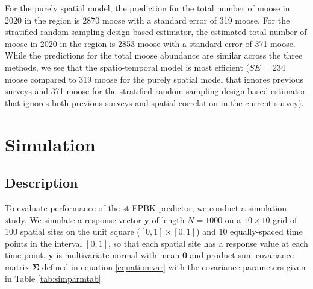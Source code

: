 \documentclass[]{interact}
\theoremstyle{plain}%
\theoremstyle{definition}
\theoremstyle{remark}
\begin{document}
For the purely spatial model, the prediction for the total number of
moose in 2020 in the region is 2870 moose with a standard error of 319
moose. For the stratified random sampling design-based estimator, the
estimated total number of moose in 2020 in the region is 2853 moose with
a standard error of 371 moose. While the predictions for the total moose
abundance are similar across the three methods, we see that the
spatio-temporal model is most efficient (\(SE\) = 234 moose compared to
319 moose for the purely spatial model that ignores previous surveys and
371 moose for the stratified random sampling design-based estimator that
ignores both previous surveys and spatial correlation in the current
survey).

\section{Simulation} \label{section:Simulation}

\subsection{Description}

To evaluate performance of the st-FPBK predictor, we conduct a
simulation study. We simulate a response vector \(\mathbf{y}\) of length
\(N = 1000\) on a \(10 \times 10\) grid of 100 spatial sites on the unit
square (\([0, 1] \times [0, 1]\)) and 10 equally-spaced time points in
the interval \([0, 1]\), so that each spatial site has a response value
at each time point. \(\mathbf{y}\) is multivariate normal with mean
\(\mathbf{0}\) and product-sum covariance matrix \(\bm{\Sigma}\) defined
in equation \ref{equation:var} with the covariance parameters given in
Table \ref{tab:simparmtab}.
\end{document}
